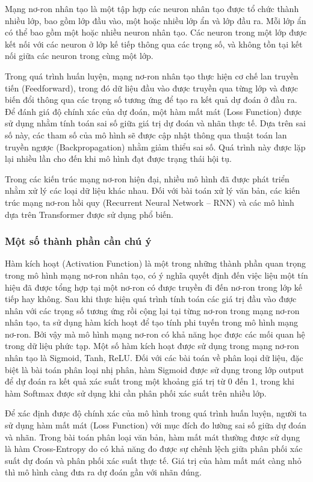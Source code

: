 \documentclass[12pt, a4paper]{report}
\begin{document}
Mạng nơ-ron nhân tạo là một tập hợp các neuron nhân tạo được tổ chức thành nhiều lớp, bao gồm lớp đầu vào, một hoặc nhiều lớp ẩn và lớp đầu ra. Mỗi lớp ẩn có thể bao gồm một hoặc nhiều neuron nhân tạo. Các neuron trong một lớp được kết nối với các neuron ở lớp kế tiếp thông qua các trọng số, và không tồn tại kết nối giữa các neuron trong cùng một lớp.

Trong quá trình huấn luyện, mạng nơ-ron nhân tạo thực hiện cơ chế lan truyền tiến (Feedforward), trong đó dữ liệu đầu vào được truyền qua từng lớp và được biến đổi thông qua các trọng số tương ứng để tạo ra kết quả dự đoán ở đầu ra. Để đánh giá độ chính xác của dự đoán, một hàm mất mát (Loss Function) được sử dụng nhằm tính toán sai số giữa giá trị dự đoán và nhãn thực tế. Dựa trên sai số này, các tham số của mô hình sẽ được cập nhật thông qua thuật toán lan truyền ngược (Backpropagation) nhằm giảm thiểu sai số. Quá trình này được lặp lại nhiều lần cho đến khi mô hình đạt được trạng thái hội tụ.

Trong các kiến trúc mạng nơ-ron hiện đại, nhiều mô hình đã được phát triển nhằm xử lý các loại dữ liệu khác nhau. Đối với bài toán xử lý văn bản, các kiến trúc mạng nơ-ron hồi quy (Recurrent Neural Network -- RNN) và các mô hình dựa trên Transformer được sử dụng phổ biến.

\subsubsection{Một số thành phần cần chú ý}

Hàm kích hoạt (Activation Function) là một trong những thành phần quan trọng trong mô hình mạng nơ-ron nhân tạo, có ý nghĩa quyết định đến việc liệu một tín hiệu đã được tổng hợp tại một nơ-ron có được truyền đi đến nơ-ron trong lớp kế tiếp hay không. Sau khi thực hiện quá trình tính toán các giá trị đầu vào được nhân với các trọng số tương ứng rồi cộng lại tại từng nơ-ron trong mạng nơ-ron nhân tạo, ta sử dụng hàm kích hoạt để tạo tính phi tuyến trong mô hình mạng nơ-ron. Bởi vậy mà mô hình mạng nơ-ron có khả năng học được các mối quan hệ trong dữ liệu phức tạp. Một số hàm kích hoạt được sử dụng trong mạng nơ-ron nhân tạo là Sigmoid, Tanh, ReLU. Đối với các bài toán về phân loại dữ liệu, đặc biệt là bài toán phân loại nhị phân, hàm Sigmoid được sử dụng trong lớp output để dự đoán ra kết quả xác suất trong một khoảng giá trị từ 0 đến 1, trong khi hàm Softmax được sử dụng khi cần phân phối xác suất trên nhiều lớp.

Để xác định được độ chính xác của mô hình trong quá trình huấn luyện, người ta sử dụng hàm mất mát (Loss Function) với mục đích đo lường sai số giữa dự đoán và nhãn. Trong bài toán phân loại văn bản, hàm mất mát thường được sử dụng là hàm Cross-Entropy do có khả năng đo được sự chênh lệch giữa phân phối xác suất dự đoán và phân phối xác suất thực tế. Giá trị của hàm mất mát càng nhỏ thì mô hình càng đưa ra dự đoán gần với nhãn đúng.
\end{document}
